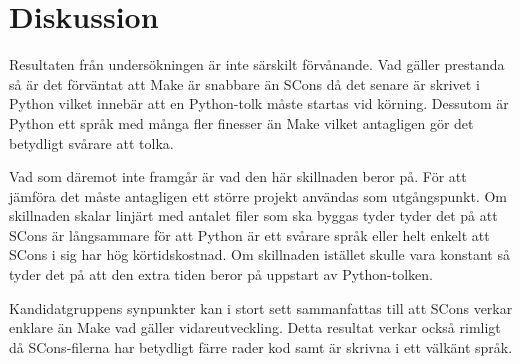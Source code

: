\section{Diskussion}
Resultaten från undersökningen är inte särskilt förvånande. Vad gäller prestanda så är det förväntat att Make är snabbare än SCons då det senare är skrivet i Python vilket innebär att en Python-tolk måste startas vid körning. Dessutom är Python ett språk med många fler finesser än Make vilket antagligen gör det betydligt svårare att tolka.

Vad som däremot inte framgår är vad den här skillnaden beror på. För att jämföra det måste antagligen ett större projekt användas som utgångspunkt. Om skillnaden skalar linjärt med antalet filer som ska byggas tyder tyder det på att SCons är långsammare för att Python är ett svårare språk eller helt enkelt att SCons i sig har hög körtidskostnad. Om skillnaden istället skulle vara konstant så tyder det på att den extra tiden beror på uppstart av Python-tolken.

Kandidatgruppens synpunkter kan i stort sett sammanfattas till att SCons verkar enklare än Make vad gäller vidareutveckling. Detta resultat verkar också rimligt då SCons-filerna har betydligt färre rader kod samt är skrivna i ett välkänt språk.
